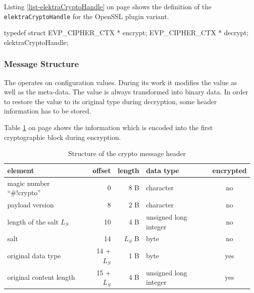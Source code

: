 Listing \ref{list-elektraCryptoHandle} on page \pageref{list-elektraCryptoHandle} shows the definition of the \texttt{elektraCryptoHandle} for the OpenSSL plugin variant.

\begin{code}[label=list-elektraCryptoHandle,language=C,caption={Definiton of elektraCryptoHandle for the OpenSSL crypto plugin variant}]
typedef struct
{
	EVP_CIPHER_CTX * encrypt;
	EVP_CIPHER_CTX * decrypt;
} elektraCryptoHandle;
\end{code}


\subsubsection{Message Structure}
\label{impl-msgstruct}

The \crypto{} operates on configuration values.
During its work it modifies the value as well as the meta-data.
The value is always transformed into binary data.
In order to restore the value to its original type during decryption, some header information has to be stored.

Table \ref{impl-msgheader} on page \pageref{impl-msgheader} shows the information which is encoded into the first cryptographic block during encryption.

\begin{table}[h]
\centering
\caption{Structure of the crypto message header}
\label{impl-msgheader}
\begin{tabular}{lrrlc}
	\textbf{element}           & \textbf{offset} & \textbf{length} & \textbf{data type}    & \textbf{encrypted} \\ \hline
	magic number ``\#!crypto'' & 0               & 8 B             & character             & no                 \\
	payload version            & 8               & 2 B             & character             & no                 \\
	length of the salt $L_S$   & 10              & 4 B             & unsigned long integer & no                 \\
	salt                       & 14              & $L_S$ B         & byte                  & no                 \\
	original data type         & 14 + $L_S$      & 1 B             & byte                  & yes                \\
	original content length    & 15 + $L_S$      & 4 B             & unsigned long integer & yes                \\ \hline
\end{tabular}
\end{table}

